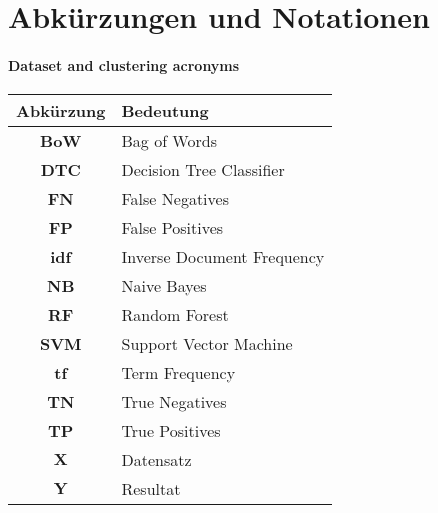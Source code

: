 






\chapter{Abkürzungen und Notationen}


\subsubsection{Dataset and clustering acronyms}
\begin{table}[H]
	\begin{tabular}{cR{\textwidth}}
		\toprule
		Abkürzung & Bedeutung \\ \midrule
		\textbf{BoW} & Bag of Words \\
		\textbf{DTC} & Decision Tree Classifier \\
		\textbf{FN} & False Negatives \\
		\textbf{FP} & False Positives \\
		\textbf{idf} & Inverse Document Frequency \\
		\textbf{NB} & Naive Bayes \\
		\textbf{RF} & Random Forest \\
		\textbf{SVM} & Support Vector Machine \\
		\textbf{tf} & Term Frequency \\
		\textbf{TN} & True Negatives \\
		\textbf{TP} & True Positives \\
		$\mathbf{X}$ & Datensatz  \\
		$\mathbf{Y}$ & Resultat \\
		
		\bottomrule
	\end{tabular}	
\end{table}


